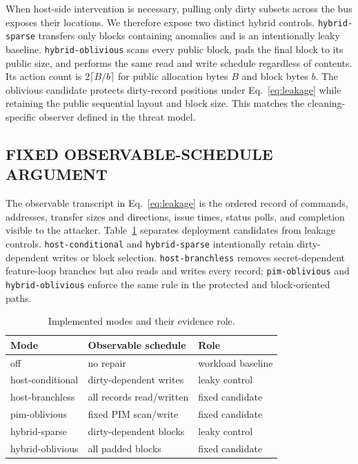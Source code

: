 \documentclass[conference]{IEEEtran}
\begin{document}
When host-side intervention is necessary, pulling only dirty subsets across the
bus exposes their locations. We therefore expose two distinct hybrid controls.
\texttt{hybrid-sparse} transfers only blocks containing anomalies and is an
intentionally leaky baseline. \texttt{hybrid-oblivious} scans every public
block, pads the final block to its public size, and performs the same read and
write schedule regardless of contents. Its action count is
$2\lceil B/b\rceil$ for public allocation bytes $B$ and block bytes $b$.
The oblivious candidate protects dirty-record positions under
Eq.~\eqref{eq:leakage} while retaining the public sequential layout and block
size. This matches the cleaning-specific observer defined in the threat model.

\subsection{FIXED OBSERVABLE-SCHEDULE ARGUMENT}
The observable transcript in Eq.~\eqref{eq:leakage} is the ordered record of
commands, addresses, transfer sizes and directions, issue times, status polls,
and completion visible to the attacker. Table~\ref{tab:design-modes} separates
deployment candidates from leakage
controls. \texttt{host-conditional} and \texttt{hybrid-sparse} intentionally
retain dirty-dependent writes or block selection. \texttt{host-branchless}
removes secret-dependent feature-loop branches but also reads and writes every
record; \texttt{pim-oblivious} and \texttt{hybrid-oblivious} enforce the same
rule in the protected and block-oriented paths.

\begin{table}[t]
\caption{Implemented modes and their evidence role.}
\label{tab:design-modes}
\centering\scriptsize
\begin{tabular}{lll}
\toprule
Mode & Observable schedule & Role\\
\midrule
off & no repair & workload baseline\\
host-conditional & dirty-dependent writes & leaky control\\
host-branchless & all records read/written & fixed candidate\\
pim-oblivious & fixed PIM scan/write & fixed candidate\\
hybrid-sparse & dirty-dependent blocks & leaky control\\
hybrid-oblivious & all padded blocks & fixed candidate\\
\bottomrule
\end{tabular}
\end{table}
\end{document}
